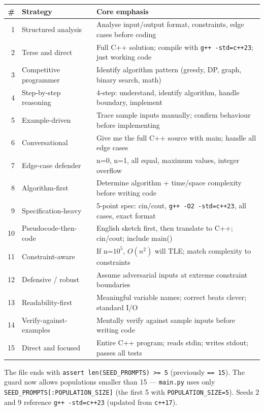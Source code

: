 \documentclass[11pt,a4paper]{report}
\newcommand{\fn}[1]{\texttt{#1}}
\begin{document}
\begin{center}
\begin{tabular}{@{}rll@{}}
\toprule
\# & Strategy & Core emphasis \\
\midrule
1  & Structured analysis     & Analyse input/output format, constraints, edge cases before coding \\
2  & Terse and direct        & Full C++ solution; compile with \fn{g++ -std=c++23}; just working code \\
3  & Competitive programmer  & Identify algorithm pattern (greedy, DP, graph, binary search, math) \\
4  & Step-by-step reasoning  & 4-step: understand, identify algorithm, handle boundary, implement \\
5  & Example-driven          & Trace sample inputs manually; confirm behaviour before implementing \\
6  & Conversational          & Give me the full C++ source with main; handle all edge cases \\
7  & Edge-case defender      & n=0, n=1, all equal, maximum values, integer overflow \\
8  & Algorithm-first         & Determine algorithm + time/space complexity before writing code \\
9  & Specification-heavy     & 5-point spec: cin/cout, \fn{g++ -O2 -std=c++23}, all cases, exact format \\
10 & Pseudocode-then-code    & English sketch first, then translate to C++; cin/cout; include main() \\
11 & Constraint-aware        & If n=$10^5$, $O(n^2)$ will TLE; match complexity to constraints \\
12 & Defensive / robust      & Assume adversarial inputs at extreme constraint boundaries \\
13 & Readability-first       & Meaningful variable names; correct beats clever; standard I/O \\
14 & Verify-against-examples & Mentally verify against sample inputs before writing code \\
15 & Direct and focused      & Entire C++ program; reads stdin; writes stdout; passes all tests \\
\bottomrule
\end{tabular}
\end{center}

The file ends with \fn{assert len(SEED\_PROMPTS) >= 5} (previously \fn{== 15}).
The guard now allows populations smaller than 15 --- \fn{main.py} uses only
\fn{SEED\_PROMPTS[:POPULATION\_SIZE]} (the first 5 with \fn{POPULATION\_SIZE=5}).
Seeds 2 and 9 reference \fn{g++ -std=c++23} (updated from \fn{c++17}).
\end{document}
